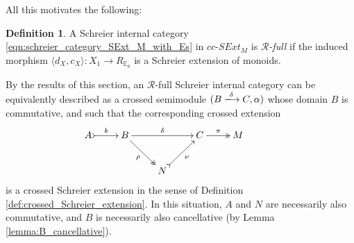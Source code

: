 \documentclass[a4paper]{amsart}
\theoremstyle{plain}
\theoremstyle{definition}
\newtheorem{definition}[subsection]{Definition}
\theoremstyle{remark}
\newcommand{\la}{\langle}
\newcommand{\ra}{\rangle}
\begin{document}
All this motivates the following:
\begin{definition}
\label{def:R-full}
A Schreier internal category \eqref{eqn:schreier_category_SExt_M_with_Es} in $cc\text{-}SExt_M$ is \emph{$\mathcal{R}$-full} if the induced morphism $\la d_X,c_X\ra\colon X_1\longrightarrow R_{\mathbb{E}_0}$ is a Schreier extension of monoids.
\end{definition}
By the results of this section, an $\mathcal{R}$-full Schreier internal category can be equivalently described as a crossed semimodule $(B\xlongrightarrow{\delta}C,\alpha)$ whose domain $B$ is commutative, and such that the corresponding crossed extension
\begin{equation*}
\xymatrix{
A \ar@{>->}[r]^-k &B \ar@{->>}[rd]_-{\rho} \ar[rr]^-{\delta} & \ &C \ar@{->>}[r]^-{\pi} &{M} \\
 &\ &N \ar@{>->}[ru]_-{\nu}&\ &\ &\
}
\end{equation*}
is a crossed Schreier extension in the sense of Definition \ref{def:crossed_Schreier_extension}. In this situation, $A$ and $N$ are necessarily also commutative, and $B$ is necessarily also cancellative (by Lemma \ref{lemma:B_cancellative}).
\end{document}
